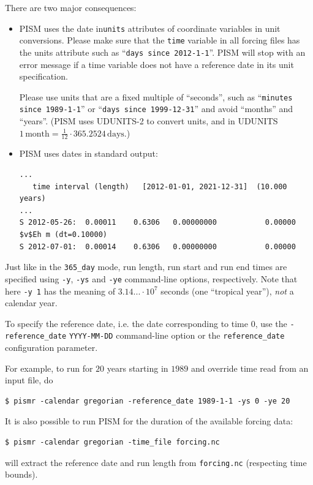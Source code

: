 \documentclass[titlepage,letterpaper,final]{scrartcl}
\newcommand{\intextoption}[1]{\texttt{-#1}\optindex{\texttt{-#1}}}
\newcommand{\txtopt}[2]{\texttt{-#1} #2\optindex{\texttt{-#1} #2}}
\begin{document}
There are two major consequences:
\begin{itemize}
\item PISM uses the date in\texttt{units} attributes of coordinate variables in
  unit conversions. Please make sure that the \texttt{time} variable in all
  forcing files has the units attribute such as ``\texttt{days since
    2012-1-1}''. PISM will stop with an error message if a time variable does
  not have a reference date in its unit specification.

  Please use units that are a fixed multiple of ``seconds'', such as
  ``\texttt{minutes since 1989-1-1}'' or ``\texttt{days since 1999-12-31}'' and
  avoid ``months'' and ``years''. (PISM uses UDUNITS-2 to convert units, and in
  UDUNITS $1\, \mathrm{month} = \frac{1}{12}\cdot 365.2524\, \mathrm{days}$.)
\item PISM uses dates in standard output:
\begin{verbatim}
...
   time interval (length)   [2012-01-01, 2021-12-31]  (10.000 years)
...
S 2012-05-26:  0.00011    0.6306   0.00000000           0.00000
$v$Eh m (dt=0.10000)
S 2012-07-01:  0.00014    0.6306   0.00000000           0.00000
\end{verbatim}
\end{itemize}

Just like in the \texttt{365_day} mode, run length, run start and run end times
are specified using \intextoption{y}, \intextoption{ys} and \intextoption{ye}
command-line options, respectively. Note that here \texttt{-y 1} has the
meaning of $3.14...\cdot 10^{7}$ seconds (one ``tropical year''), \emph{not} a
calendar year.

To specify the reference date, i.e. the date corresponding to time $0$, use the
\txtopt{reference_date}{\texttt{YYYY-MM-DD}} command-line option or the
\texttt{reference_date} configuration parameter.

For example, to run for $20$ years starting in $1989$ and override time read
from an input file, do
\begin{verbatim}
$ pismr -calendar gregorian -reference_date 1989-1-1 -ys 0 -ye 20
\end{verbatim}

It is also possible to run PISM for the duration of the available forcing data:
\begin{verbatim}
$ pismr -calendar gregorian -time_file forcing.nc
\end{verbatim}
will extract the reference date and run length from \texttt{forcing.nc}
(respecting time bounds).
\end{document}

